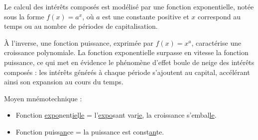\documentclass{article}
\begin{document}
            \begin{tcolorbox}[
                colback=lightgreen, 
                colframe=lightgreen, 
                boxrule=0.5pt, 
                arc=0pt, 
                left=10pt, 
                right=10pt, 
                top=6pt, 
                bottom=6pt, 
                boxsep=2pt, 
                before upper={\faLightbulb\hspace{10pt}}
            ]
                Le calcul des intérêts composés est modélisé par une fonction exponentielle, notée sous la forme $f(x)=a^x$, où $a$ est une constante positive et $x$ correspond au temps ou au nombre de périodes de capitalisation.

                À l'inverse, une fonction puissance, exprimée par $f(x)=x^a$, caractérise une croissance polynomiale. La fonction exponentielle surpasse en vitesse la fonction puissance, ce qui met en évidence le phénomène d'effet boule de neige des intérêts composés : les intérêts générés à chaque période s'ajoutent au capital, accélérant ainsi son expansion au cours du temps.

                Moyen mnémotechnique : 
                \begin{itemize}
                    \item Fonction \underline{expo}nent\underline{ie}l\underline{le} = l'\underline{expo}sant var\underline{ie}, la croissance s'embal\underline{le}.
                    \item Fonction puiss\underline{an}ce = la puissance est const\underline{an}te.
                \end{itemize}
            \end{tcolorbox}
\end{document}
